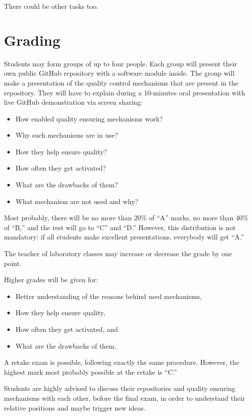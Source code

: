 \documentclass[nobrand,anonymous,nodate,nosecurity]{huawei}
\begin{document}
{There could be other tasks too.

\newpage
\section*{Grading}

Students may form groups of up to four people. Each group will present
their own public GitHub repository with a software module inside. The group
will make a presentation of the quality control mechanisms that are
present in the repository. They will have to explain during a 10-minutes
oral presentation with live GitHub demonstration via screen sharing:

\begin{itemize}
	\item How enabled quality ensuring mechanisms work?
	\item Why such mechanisms are in use?
	\item How they help ensure quality?
	\item How often they get activated?
	\item What are the drawbacks of them?
	\item What mechanism are not used and why?
\end{itemize}

Most probably, there will
be no more than 20\% of ``A'' marks, no more than 40\% of ``B,''
and the rest will go to ``C'' and ``D.'' However, this distribution is
not mandatory: if all students make excellent presentations, everybody
will get ``A.''

The teacher of laboratory classes may increase or decrease the grade
by one point.

Higher grades will be given for:

\begin{itemize}
	\item Better understanding of the reasons behind used mechanisms,
	\item How they help ensure quality,
	\item How often they get activated,
	and
	\item What are the drawbacks of them.
\end{itemize}

A retake exam is possible, following exactly the same procedure. However,
the highest mark most probably possible at the retake is ``C.''

Students are highly advised to discuss
their repositories and quality ensuring mechanisms with each other,
before the final exam, in order to understand their relative positions
and maybe trigger new ideas.

}
\end{document}
